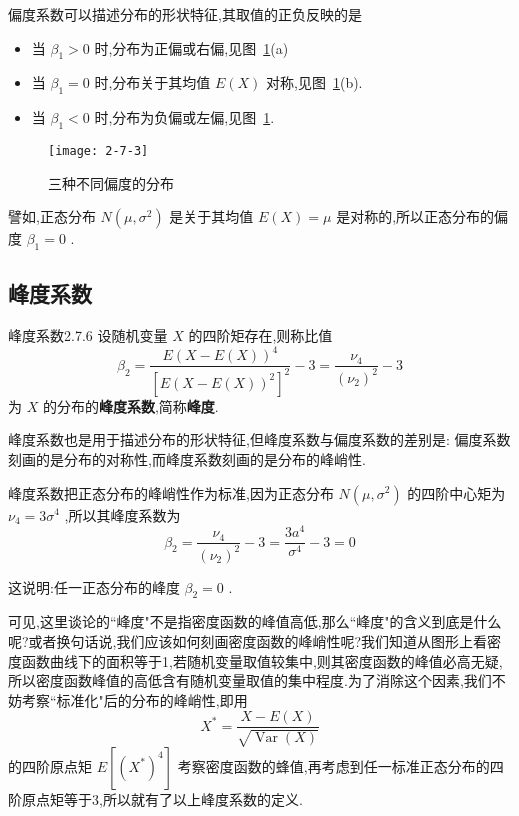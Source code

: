 偏度系数可以描述分布的形状特征,其取值的正负反映的是

\begin{itemize}
	\item 当 $ \beta_{1}>0 $ 时,分布为正偏或右偏,见图~\ref{fig:2.7.3}(a)
	\item 当 $ \beta_{1}=0 $ 时,分布关于其均值 $ E(X) $ 对称,见图~\ref{fig:2.7.3}(b).
	\item 当 $ \beta_{1}<0 $ 时,分布为负偏或左偏,见图~\ref{fig:2.7.3}.
\end{itemize}

\begin{figure}
	\centering
	\texttt{[image: 2-7-3]}
	\caption{三种不同偏度的分布}
	\label{fig:2.7.3}
\end{figure}


譬如,正态分布 $ N\left(\mu, \sigma^{2}\right) $ 是关于其均值 $ E(X)=\mu $ 是对称的,所以正态分布的偏度 $ \beta_{1}=0 $ .

\subsection{峰度系数}\label{ssec:2.7.6}

\begin{definition}{峰度系数}{2.7.6}
	设随机变量 $ X $ 的四阶矩存在,则称比值
	\begin{equation}
	\beta_{2}=\frac{E(X-E(X))^{4}}{\left[E(X-E(X))^{2}\right]^{2}}-3=\frac{\nu_{4}}{\left(\nu_{2}\right)^{2}}-3 \label{eq:2.7.10}
	\end{equation}
	为 $ X $ 的分布的\textbf{峰度系数},简称\textbf{峰度}.
\end{definition}

峰度系数也是用于描述分布的形状特征,但峰度系数与偏度系数的差别是:
偏度系数刻画的是分布的对称性,而峰度系数刻画的是分布的峰峭性.

峰度系数把正态分布的峰峭性作为标准,因为正态分布 $ N\left(\mu, \sigma^{2}\right) $ 的四阶中心矩为 $ \nu_{4}=3 \sigma^{4} $ ,所以其峰度系数为
\[
\beta_{2}=\frac{\nu_{4}}{\left(\nu_{2}\right)^{2}}-3=\frac{3 a^{4}}{\sigma^{4}}-3=0
\]

这说明:任一正态分布的峰度 $ \beta_{2}=0 $ .

可见,这里谈论的``峰度"不是指密度函数的峰值高低,那么``峰度"的含义到底是什么呢?或者换句话说,我们应该如何刻画密度函数的峰峭性呢?我们知道从图形上看密度函数曲线下的面积等于1,若随机变量取值较集中,则其密度函数的峰值必高无疑,所以密度函数峰值的高低含有随机变量取值的集中程度.为了消除这个因素,我们不妨考察``标准化"后的分布的峰峭性,即用
\[
X^{*}=\frac{X-E(X)}{\sqrt{\operatorname{Var}(X)}}
\]
的四阶原点矩 $ E\left[\left(X^{*}\right)^{4}\right] $ 考察密度函数的蜂值,再考虑到任一标准正态分布的四阶原点矩等于3,所以就有了以上峰度系数的定义.

